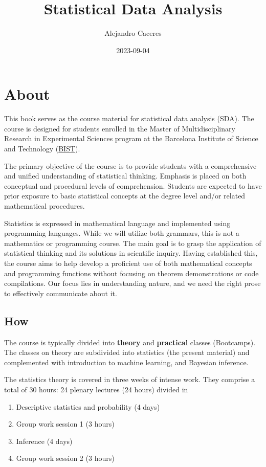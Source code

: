 \documentclass[
]{book}
\title{Statistical Data Analysis}
\author{Alejandro Caceres}
\date{2023-09-04}
\begin{document}
\maketitle

{
\setcounter{tocdepth}{1}
\tableofcontents
}
\hypertarget{about}{%
\chapter{About}\label{about}}

This book serves as the course material for statistical data analysis (SDA). The course is designed for students enrolled in the Master of Multidisciplinary Research in Experimental Sciences program at the Barcelona Institute of Science and Technology (\href{https://bist.eu/}{BIST}).

The primary objective of the course is to provide students with a comprehensive and unified understanding of statistical thinking. Emphasis is placed on both conceptual and procedural levels of comprehension. Students are expected to have prior exposure to basic statistical concepts at the degree level and/or related mathematical procedures.

Statistics is expressed in mathematical language and implemented using programming languages. While we will utilize both grammars, this is not a mathematics or programming course. The main goal is to grasp the application of statistical thinking and its solutions in scientific inquiry. Having established this, the course aims to help develop a proficient use of both mathematical concepts and programming functions without focusing on theorem demonstrations or code compilations. Our focus lies in understanding nature, and we need the right prose to effectively communicate about it.

\hypertarget{how}{%
\section{How}\label{how}}

The course is typically divided into \textbf{theory} and \textbf{practical} classes (Bootcamps). The classes on theory are subdivided into statistics (the present material) and complemented with introduction to machine learning, and Bayesian inference.

The statistics theory is covered in three weeks of intense work. They comprise a total of 30 hours: 24 plenary lectures (24 hours) divided in

\begin{enumerate}
\def\labelenumi{\arabic{enumi}.}
\item
  Descriptive statistics and probability (4 days)
\item
  Group work session 1 (3 hours)
\item
  Inference (4 days)
\item
  Group work session 2 (3 hours)
\end{enumerate}
\end{document}
